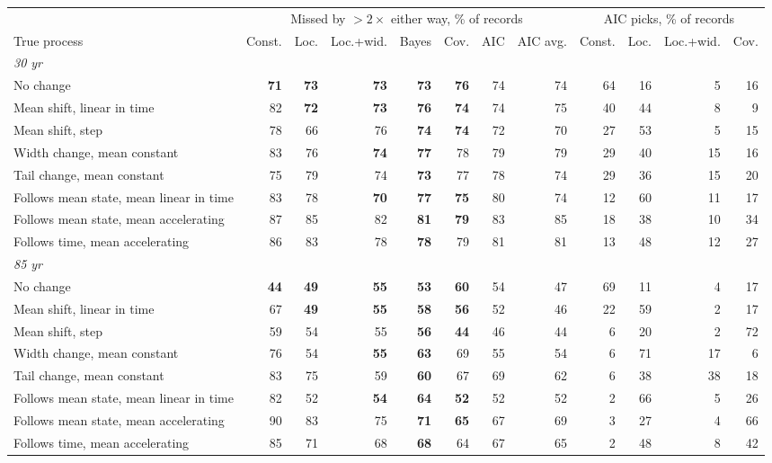 \begin{tabular}{lrrrrrrrrrrr}
\toprule
 & \multicolumn{7}{c}{Missed by $>2\times$ either way, \% of records} & \multicolumn{4}{c}{AIC picks, \% of records} \\
\cmidrule(lr){2-8} \cmidrule(lr){9-12}
True process & Const. & Loc. & Loc.+wid. & Bayes & Cov. & AIC & AIC avg. & Const. & Loc. & Loc.+wid. & Cov. \\
\midrule
\multicolumn{12}{l}{\emph{30 yr}} \\
No change & \textbf{71} & \textbf{73} & \textbf{73} & \textbf{73} & \textbf{76} & 74 & 74 & 64 & 16 & 5 & 16 \\
Mean shift, linear in time & 82 & \textbf{72} & \textbf{73} & \textbf{76} & \textbf{74} & 74 & 75 & 40 & 44 & 8 & 9 \\
Mean shift, step & 78 & 66 & 76 & \textbf{74} & \textbf{74} & 72 & 70 & 27 & 53 & 5 & 15 \\
Width change, mean constant & 83 & 76 & \textbf{74} & \textbf{77} & 78 & 79 & 79 & 29 & 40 & 15 & 16 \\
Tail change, mean constant & 75 & 79 & 74 & \textbf{73} & 77 & 78 & 74 & 29 & 36 & 15 & 20 \\
Follows mean state, mean linear in time & 83 & 78 & \textbf{70} & \textbf{77} & \textbf{75} & 80 & 74 & 12 & 60 & 11 & 17 \\
Follows mean state, mean accelerating & 87 & 85 & 82 & \textbf{81} & \textbf{79} & 83 & 85 & 18 & 38 & 10 & 34 \\
Follows time, mean accelerating & 86 & 83 & 78 & \textbf{78} & 79 & 81 & 81 & 13 & 48 & 12 & 27 \\
\multicolumn{12}{l}{\emph{85 yr}} \\
No change & \textbf{44} & \textbf{49} & \textbf{55} & \textbf{53} & \textbf{60} & 54 & 47 & 69 & 11 & 4 & 17 \\
Mean shift, linear in time & 67 & \textbf{49} & \textbf{55} & \textbf{58} & \textbf{56} & 52 & 46 & 22 & 59 & 2 & 17 \\
Mean shift, step & 59 & 54 & 55 & \textbf{56} & \textbf{44} & 46 & 44 & 6 & 20 & 2 & 72 \\
Width change, mean constant & 76 & 54 & \textbf{55} & \textbf{63} & 69 & 55 & 54 & 6 & 71 & 17 & 6 \\
Tail change, mean constant & 83 & 75 & 59 & \textbf{60} & 67 & 69 & 62 & 6 & 38 & 38 & 18 \\
Follows mean state, mean linear in time & 82 & 52 & \textbf{54} & \textbf{64} & \textbf{52} & 52 & 52 & 2 & 66 & 5 & 26 \\
Follows mean state, mean accelerating & 90 & 83 & 75 & \textbf{71} & \textbf{65} & 67 & 69 & 3 & 27 & 4 & 66 \\
Follows time, mean accelerating & 85 & 71 & 68 & \textbf{68} & 64 & 67 & 65 & 2 & 48 & 8 & 42 \\
\bottomrule
\end{tabular}
